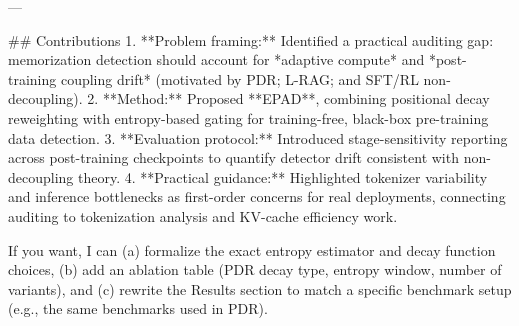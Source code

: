 ---

## Contributions  
1. **Problem framing:** Identified a practical auditing gap: memorization detection should account for *adaptive compute* and *post-training coupling drift* (motivated by PDR; L-RAG; and SFT/RL non-decoupling).  
2. **Method:** Proposed **EPAD**, combining positional decay reweighting with entropy-based gating for training-free, black-box pre-training data detection.  
3. **Evaluation protocol:** Introduced stage-sensitivity reporting across post-training checkpoints to quantify detector drift consistent with non-decoupling theory.  
4. **Practical guidance:** Highlighted tokenizer variability and inference bottlenecks as first-order concerns for real deployments, connecting auditing to tokenization analysis and KV-cache efficiency work.

If you want, I can (a) formalize the exact entropy estimator and decay function choices, (b) add an ablation table (PDR decay type, entropy window, number of variants), and (c) rewrite the Results section to match a specific benchmark setup (e.g., the same benchmarks used in PDR).